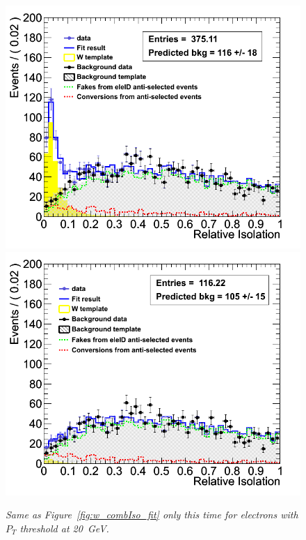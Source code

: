 \begin{figure}[h!]
\centering
\includegraphics[scale=0.32]{Plots/w_combIso_pt20_fit_MC.png}
\includegraphics[scale=0.32]{Plots/w_combIso_pt20_METanticut_fit_MC.png}
\caption{\textit{Same as Figure~\ref{fig:w_combIso_fit} only this time for electrons with $P_{T}$ threshold at 20~GeV.  }}\label{fig:w_combIso_fit_pt20}
\end{figure}

